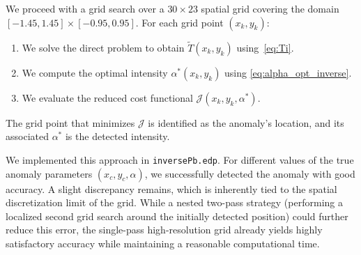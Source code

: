 We proceed with a grid search over a $30\times23$ spatial grid covering the domain $[-1.45, 1.45]\times[-0.95, 0.95]$. For each grid point $(x_k, y_k)$:
\begin{enumerate}
    \item We solve the direct problem to obtain $\tilde{T}(x_k, y_k)$ using~\cref{eq:Ti}.
    \item We compute the optimal intensity $\alpha^*(x_k, y_k)$ using \cref{eq:alpha_opt_inverse}.
    \item We evaluate the reduced cost functional $\mathcal{J}(x_k, y_k, \alpha^*)$.
\end{enumerate}
The grid point that minimizes $\mathcal{J}$ is identified as the anomaly's location, and its associated $\alpha^*$ is the detected intensity.

We implemented this approach in \texttt{inversePb.edp}.
For different values of the true anomaly parameters $(x_c, y_c, \alpha)$, we successfully detected the anomaly with good accuracy. A slight discrepancy remains, which is inherently tied to the spatial discretization limit of the grid. While a nested two-pass strategy (performing a localized second grid search around the initially detected position) could further reduce this error, the single-pass high-resolution grid already yields highly satisfactory accuracy while maintaining a reasonable computational time.
